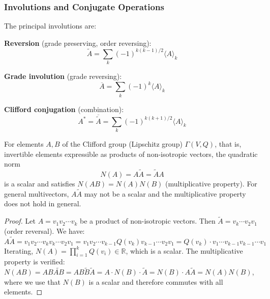 \subsubsection{Involutions and Conjugate Operations}

\begin{definition}\label{def:involuciones_clifford}
The principal involutions are:

\textbf{Reversion} (grade preserving, order reversing):
\begin{equation}
    \widetilde{A} = \sum_k (-1)^{k(k-1)/2} \langle A \rangle_k
\end{equation}

\textbf{Grade involution} (grade reversing):
\begin{equation}
    \overline{A} = \sum_k (-1)^k \langle A \rangle_k
\end{equation}

\textbf{Clifford conjugation} (combination):
\begin{equation}
    A^* = \overline{\widetilde{A}} = \sum_k (-1)^{k(k+1)/2} \langle A \rangle_k
\end{equation}
\end{definition}

\begin{proposition}\label{prop:norma_clifford}
For elements $A, B$ of the Clifford group (Lipschitz group) $\Gamma(V,Q)$, that is, invertible elements expressible as products of non-isotropic vectors, the quadratic norm
\begin{equation}
    N(A) = A \widetilde{A} = \widetilde{A} A
\end{equation}
is a scalar and satisfies $N(AB) = N(A)N(B)$ (multiplicative property). For general multivectors, $A\widetilde{A}$ may not be a scalar and the multiplicative property does not hold in general.
\end{proposition}

\begin{proof}
Let $A = v_1 v_2 \cdots v_k$ be a product of non-isotropic vectors. Then $\widetilde{A} = v_k \cdots v_2 v_1$ (order reversal). We have:
\[
A\widetilde{A} = v_1 v_2 \cdots v_k v_k \cdots v_2 v_1 = v_1 v_2 \cdots v_{k-1} Q(v_k) v_{k-1} \cdots v_2 v_1 = Q(v_k) \cdot v_1 \cdots v_{k-1} v_{k-1} \cdots v_1
\]
Iterating, $N(A) = \prod_{i=1}^k Q(v_i) \in \mathbb{R}$, which is a scalar. The multiplicative property is verified: $N(AB) = AB\widetilde{AB} = AB\widetilde{B}\widetilde{A} = A \cdot N(B) \cdot \widetilde{A} = N(B) \cdot A\widetilde{A} = N(A)N(B)$, where we use that $N(B)$ is a scalar and therefore commutes with all elements.
\end{proof}


